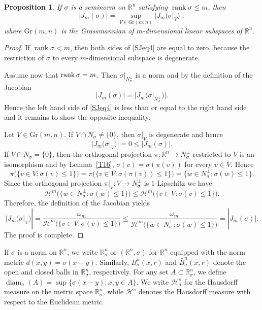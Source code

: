 \documentclass[12pt,leqno]{amsart}
\newtheorem{proposition}[theorem]{Proposition}
\theoremstyle{definition}
\newcommand{\bbbr}{\mathbb R}
\def\diam{\operatorname{diam}}
\def\H{{\mathcal H}}
\def\rank{{\rm rank\,}}
\numberwithin{theorem}{section} \numberwithin{equation}{section}
\begin{document}
\begin{proposition}
\label{SJT7}
If $\sigma$ is a seminorm on $\bbbr^n$ satisfying $\operatorname{rank}\sigma\leq m$, then
\begin{equation}
\label{SJeq4}
|J_m(\sigma)|
=
\sup_{V\in \mathrm{Gr}(m,n)} |J_m(\sigma|_V)|,
\end{equation}
where $\mathrm{Gr}(m,n)$ is the Grassmannian of $m$-dimensional linear
subspaces of $\mathbb{R}^n$.
\end{proposition}
\begin{proof}
If $\operatorname{rank}\sigma<m$, then both sides of \eqref{SJeq4} are
equal to zero, because the restriction of $\sigma$ to every
$m$-dimensional subspace is degenerate.

Assume now that $\rank\sigma=m$. Then $\sigma|_{N_\sigma^\perp}$ is a norm and
by the definition of the Jacobian
$$
|J_m(\sigma)|=\big|J_m\big(\sigma|_{N_\sigma^\perp}\big)\big|.
$$
Hence the left hand side of \eqref{SJeq4} is less than or equal to the right hand side and it remains to show the opposite inequality.

Let  $V\in \mathrm{Gr}(m,n)$. If $V\cap N_\sigma\neq\{ 0\}$, then $\sigma|_V$ is degenerate and hence
$$
|J_m(\sigma|_V)|=0\leq |J_m(\sigma)|.
$$
If $V\cap N_\sigma=\{ 0\}$,
then the orthogonal projection $\pi:\bbbr^n\to N_\sigma^\perp$ restricted to $V$ is an isomorphism and by Lemma~\ref{T16}, $\sigma(v)=\sigma(\pi(v))$ for every $v\in V$.
Hence
\[
\pi\bigl(\{v\in V:\sigma(v)\leq 1\}\bigr)
=
\pi\bigl(\{v\in V:\sigma(\pi (v))\leq 1\}\bigr)
=
\{w\in N_\sigma^\perp:\sigma(w)\leq 1\}.
\]
Since the orthogonal projection
$\pi|_V:V\to N_\sigma^\perp$ is $1$-Lipschitz we have
\[
\mathcal H^m\bigl(\{w\in N_\sigma^\perp:\sigma(w)\leq 1\}\bigr)
\leq
\mathcal H^m\bigl(\{v\in V:\sigma(v)\leq 1\}\bigr).
\]
Therefore, the definition of the Jacobian yields
\[
|J_m(\sigma|_V)|
=
\frac{\omega_m}
{\mathcal H^m\bigl(\{v\in V:\sigma(v)\leq 1\}\bigr)}
\leq
\frac{\omega_m}
{\H^m\bigl(\{w\in N_\sigma^\perp:\sigma(w)\leq 1\}\bigr)}
=
|J_m(\sigma)|.
\]
The proof is complete.
\end{proof}
If $\sigma$ is a norm on $\bbbr^n$, we write $\bbbr^n_\sigma$ or $(\bbbr^n,\sigma)$ for $\bbbr^n$ equipped with the norm metric
$d(x,y)=\sigma(x-y)$.
Similarly, $B^n_\sigma(x,r)$ and $\bar{B}^n_\sigma(x,r)$ denote the open and closed balls in $\bbbr^n_\sigma$, respectively. For any set $A\subset \bbbr^n_\sigma$, we define
$\diam_\sigma(A)=\sup\{\sigma(x-y):x,y\in A\}$.
We write $\H^s_\sigma$ for the Hausdorff measure on the metric space $\bbbr^n_\sigma$, while $\H^s$ denotes the Hausdorff measure with respect to the Euclidean metric.
\end{document}
